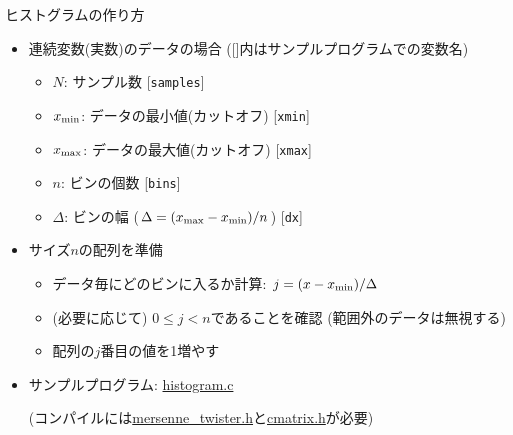 \begin{frame}[t,fragile]{ヒストグラムの作り方}
  \begin{itemize}
  \item 連続変数(実数)のデータの場合 ([]内はサンプルプログラムでの変数名)
    \begin{itemize}
    \item $N$: サンプル数 [{\tt samples}]
    \item $x_{\rm min}$: データの最小値(カットオフ) [{\tt xmin}]
    \item $x_{\rm max}$: データの最大値(カットオフ) [{\tt xmax}]
    \item $n$: ビンの個数 [{\tt bins}]
    \item $\Delta$: ビンの幅 ($\Delta=(x_{\rm max}-x_{\rm min}) / n$) [{\tt dx}]
    \end{itemize}
  \item サイズ$n$の配列を準備
    \begin{itemize}
    \item データ毎にどのビンに入るか計算: $j = (x - x_{\rm min}) / \Delta$
    \item (必要に応じて) $0 \le j < n$であることを確認 (範囲外のデータは無視する)
    \item 配列の$j$番目の値を1増やす
    \end{itemize}
  \item サンプルプログラム: \href{https://github.com/todo-group/computer-experiments/blob/master/exercise/monte_carlo/histogram.c}{histogram.c}

    (コンパイルには\href{https://github.com/todo-group/computer-experiments/blob/master/exercise/include/mersenne_twister.h}{mersenne\_twister.h}と\href{https://github.com/todo-group/computer-experiments/blob/master/exercise/include/cmatrix.h}{cmatrix.h}が必要)
  \end{itemize}
  \vspace*{-5.5cm} \hfill {}
\end{frame}
